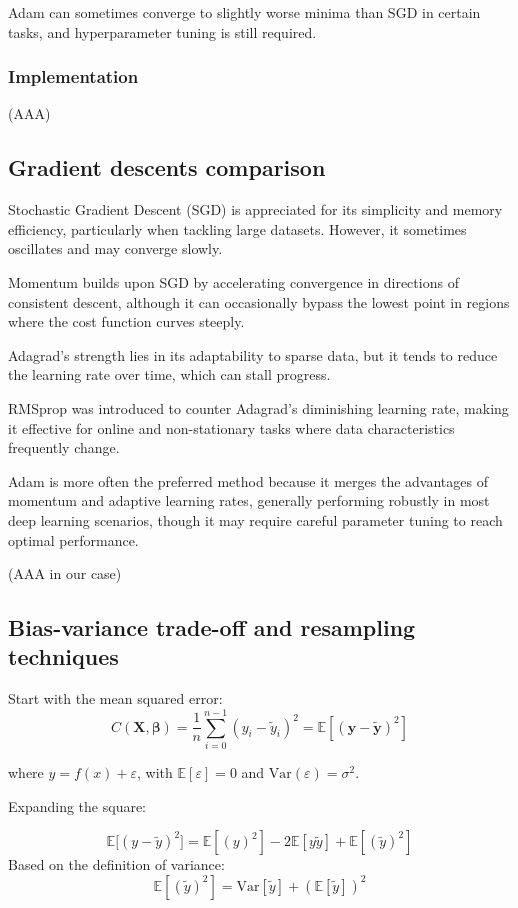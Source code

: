 \documentclass[%
 reprint,            %
 amsmath,amssymb,
 aps,
]{revtex4-2}
\begin{document}
Adam can sometimes converge to slightly worse minima than SGD in certain tasks, and hyperparameter tuning is still required.
\subsubsection{Implementation}
(AAA)

\subsection{Gradient descents comparison}
Stochastic Gradient Descent (SGD) is appreciated for its simplicity and memory efficiency, particularly when tackling large datasets. However, it sometimes oscillates and may converge slowly. 

Momentum builds upon SGD by accelerating convergence in directions of consistent descent, although it can occasionally bypass the lowest point in regions where the cost function curves steeply. 

Adagrad's strength lies in its adaptability to sparse data, but it tends to reduce the learning rate over time, which can stall progress. 

RMSprop was introduced to counter Adagrad's diminishing learning rate, making it effective for online and non-stationary tasks where data characteristics frequently change. 

Adam is more often the preferred method because it merges the advantages of momentum and adaptive learning rates, generally performing robustly in most deep learning scenarios, though it may require careful parameter tuning to reach optimal performance.

(AAA in our case)

\subsection{Bias-variance trade-off and resampling techniques}
Start with the mean squared error: 
$$C(\boldsymbol{X},\boldsymbol{\beta}) =\frac{1}{n}\sum_{i=0}^{n-1}(y_i-\tilde{y}_i)^2=\mathbb{E}\left[(\boldsymbol{y}-\boldsymbol{\tilde{y}})^2\right] $$

where $y = f(x) + \varepsilon$, with $\mathbb{E}[\varepsilon] = 0$ and $\mathrm{Var}(\varepsilon) = \sigma^2$.  

Expanding the square:

$$
\mathbb{E}[(y - \tilde y)^2\big] = \mathbb{E}[(y)^2]-2\mathbb{E}[y \tilde y]+\mathbb{E}[(\tilde y)^2] 
$$
Based on the definition of variance:
$$\mathbb{E}[(\tilde y)^2] = \mathrm{Var}[\tilde y] + (\mathbb{E}[\tilde y])^2$$
\end{document}
